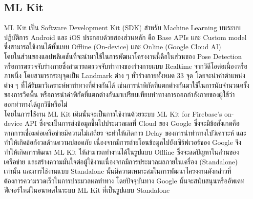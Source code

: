 \subsection{ML Kit}
ML Kit เป็น Software Development Kit (SDK) สำหรับ Machine Learning บนระบบปฏิบัติการ Android และ iOS ประกอบด้วยสองส่วนหลัก คือ Base APIs และ Custom model ซึ่งสามารถใช้งานได้ทั้งแบบ Offline (On-device) และ Online (Google Cloud AI)
\\\indent
โดยในส่วนของแอปพลิเคชันที่จะนำมาใช้ในการพัฒนาโครงงานนี้คือในส่วนของ Pose Detection หรือการตรวจจับร่างกายซึ่งสามารถตรวจจับท่าทางของร่างกายแบบ Realtime จากวิดีโอต่อเนื่องหรือภาพนิ่ง โดยสามารถระบุจุดเป็น Landmark ต่าง ๆ ทั่วร่างกายทั้งหมด 33 จุด โดยจะนำค่าตำแหน่งต่าง ๆ ที่ได้รับมาวิเคราะห์หาท่าทางที่ต่างกันได้ เช่นการนำพิกัดที่แตกต่างกันมาใช้ในการนับจำนวนครั้งของการวิดพื้น หรือการนำค่าพิกัดที่แตกต่างกันมาเปรียบเทียบท่าทางการออกกำลังกายของผู้ใช้ว่าออกท่าทางได้ถูกวิธีหรือไม่
\\\indent
โดยในการใช้งาน ML Kit เดิมนั้นจะเป็นการใช้งานด้วยระบบ ML Kit for Firebase’s on-device API ซึ่งจะเป็นการส่งข้อมูลขึ้นไปประมวลผลที่ Cloud ของ Google ซึ่งจะมีข้อสังเกตคือ หากการเชื่อมต่อเครือข่ายมีความไม่เสถียร จะทำให้เกิดการ Delay ของการนำท่าทางไปวิเคราะห์ และทำให้เกิดข้อกังวลด้านความปลอดภัย เนื่องจากมีการถ่ายโอนข้อมูลไปยังเซิร์ฟเวอร์ของ Google จึงทำให้เกิดการพัฒนา ML Kit ให้สามารถทำงานได้ในรูปแบบ Offline ซึ่งจะลดปัญหาในส่วนของเครือข่าย และสร้างความมั่นใจต่อผู้ใช้งานเนื่องจากมีการประมวลผลภายในเครื่อง (Standalone) เท่านั้น และการใช้งานแบบ Standalone นั้นมีความเหมาะสมในการพัฒนาโครงงานดังกล่าวที่ต้องการความรวดเร็วในการประมวลผลท่าทาง โดยปัจจุบันทาง Google นั้นจะสนับสนุนหรืออัพเดทฟีเจอร์ใหม่ในอนาคตในระบบ ML Kit ที่เป็นรูปแบบ Standalone

